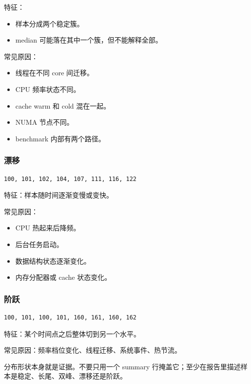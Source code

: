 特征：

\begin{itemize}
  \item 样本分成两个稳定簇。
  \item median 可能落在其中一个簇，但不能解释全部。
\end{itemize}

常见原因：

\begin{itemize}
  \item 线程在不同 core 间迁移。
  \item CPU 频率状态不同。
  \item cache warm 和 cold 混在一起。
  \item NUMA 节点不同。
  \item benchmark 内部有两个路径。
\end{itemize}

\subsubsection{漂移}

\begin{lstlisting}
100, 101, 102, 104, 107, 111, 116, 122
\end{lstlisting}

特征：样本随时间逐渐变慢或变快。

常见原因：

\begin{itemize}
  \item CPU 热起来后降频。
  \item 后台任务启动。
  \item 数据结构状态逐渐变化。
  \item 内存分配器或 cache 状态变化。
\end{itemize}

\subsubsection{阶跃}

\begin{lstlisting}
100, 101, 100, 101, 160, 161, 160, 162
\end{lstlisting}

特征：某个时间点之后整体切到另一个水平。

常见原因：频率档位变化、线程迁移、系统事件、热节流。

\begin{keyidea}
分布形状本身就是证据。不要只用一个 summary 行掩盖它；至少在报告里描述样本是稳定、长尾、双峰、漂移还是阶跃。
\end{keyidea}

